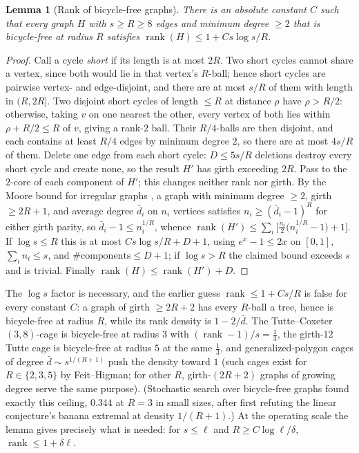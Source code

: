 \documentclass[11pt]{article}
\newtheorem{lemma}{Lemma}
\theoremstyle{remark}
\begin{document}
\begin{lemma}[Rank of bicycle-free graphs]\label{lem:rank}
There is an absolute constant $C$ such that every graph $H$ with
$s\ge R\ge8$ edges and minimum degree $\ge2$ that is bicycle-free at
radius $R$ satisfies
$\operatorname{rank}(H)\le1+Cs\log s/R$.
\end{lemma}

\begin{proof}
Call a cycle \emph{short} if its length is at most $2R$. Two short
cycles cannot share a vertex, since both would lie in that vertex's
$R$-ball; hence short cycles are pairwise vertex- and edge-disjoint,
and there are at most $s/R$ of them with length in $(R,2R]$. Two
disjoint short cycles of length $\le R$ at distance $\rho$ have
$\rho>R/2$: otherwise, taking $v$ on one nearest the other, every
vertex of both lies within $\rho+R/2\le R$ of $v$, giving a rank-$2$
ball. Their $R/4$-balls are then disjoint, and each contains at least
$R/4$ edges by minimum degree $2$, so there are at most $4s/R$ of
them. Delete one edge from each short cycle: $D\le5s/R$ deletions
destroy every short cycle and create none, so the result $H'$ has
girth exceeding $2R$. Pass to the $2$-core of each component of $H'$;
this changes neither rank nor girth. By the Moore bound for irregular
graphs \cite{ahl02}, a graph with minimum degree $\ge2$, girth
$\ge2R+1$, and average degree $\bar d_i$ on $n_i$ vertices satisfies
$n_i\ge(\bar d_i-1)^{R}$ for either girth parity, so
$\bar d_i-1\le n_i^{1/R}$, whence
$\operatorname{rank}(H')\le\sum_i\big[\tfrac{n_i}2\big(n_i^{1/R}-1\big)+1\big]$.
If $\log s\le R$ this is at most $Cs\log s/R+D+1$, using
$e^{x}-1\le2x$ on $[0,1]$, $\sum_in_i\le s$, and
$\#\mathrm{components}\le D+1$; if $\log s>R$ the claimed bound
exceeds $s$ and is trivial. Finally
$\operatorname{rank}(H)\le\operatorname{rank}(H')+D$.
\end{proof}

The $\log s$ factor is necessary, and the earlier guess
$\operatorname{rank}\le1+Cs/R$ is false for every constant $C$: a
graph of girth $\ge2R+2$ has every $R$-ball a tree, hence is
bicycle-free at radius $R$, while its rank density is $1-2/\bar d$.
The Tutte--Coxeter $(3,8)$-cage is bicycle-free at radius $3$ with
$(\operatorname{rank}-1)/s=\tfrac13$, the girth-$12$ Tutte cage is
bicycle-free at radius $5$ at the same $\tfrac13$, and
generalized-polygon cages of degree $\bar d\sim s^{1/(R+1)}$ push the
density toward $1$ (such cages exist for $R\in\{2,3,5\}$ by
Feit--Higman; for other $R$, girth-$(2R+2)$ graphs of growing degree
serve the same purpose). (Stochastic search over bicycle-free
graphs found exactly this ceiling, $0.344$ at $R=3$ in small sizes,
after first refuting the linear conjecture's banana extremal at
density $1/(R+1)$.) At the operating scale the lemma gives precisely
what is needed: for $s\le\ell$ and $R\ge C\log\ell/\delta$,
$\operatorname{rank}\le1+\delta\ell$.
\end{document}
